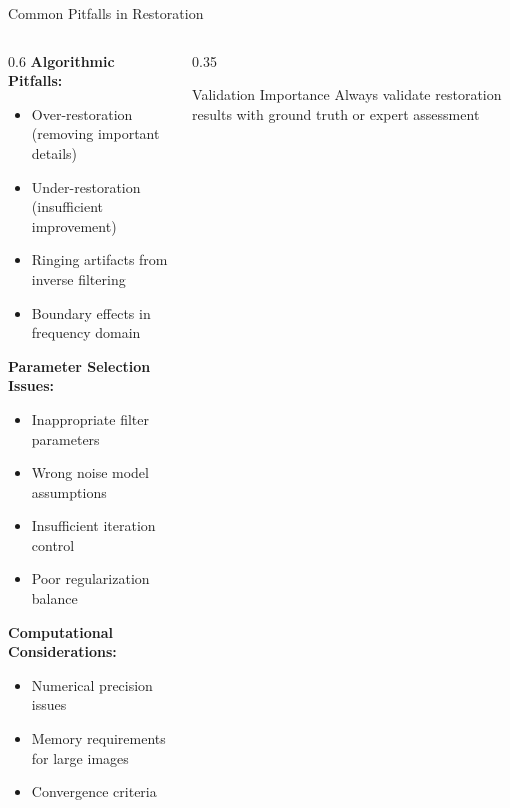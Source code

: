 \documentclass[aspectratio=169,10pt]{beamer}
\begin{document}
\begin{frame}{Common Pitfalls in Restoration}
    \begin{columns}[T]
        \begin{column}{0.6\textwidth}
            \textbf{Algorithmic Pitfalls:}
            \begin{itemize}
                \item Over-restoration (removing important details)
                \item Under-restoration (insufficient improvement)
                \item Ringing artifacts from inverse filtering
                \item Boundary effects in frequency domain
            \end{itemize}

            \textbf{Parameter Selection Issues:}
            \begin{itemize}
                \item Inappropriate filter parameters
                \item Wrong noise model assumptions
                \item Insufficient iteration control
                \item Poor regularization balance
            \end{itemize}

            \textbf{Computational Considerations:}
            \begin{itemize}
                \item Numerical precision issues
                \item Memory requirements for large images
                \item Convergence criteria
            \end{itemize}
        \end{column}
        \begin{column}{0.35\textwidth}
            \begin{keypoint}{Validation Importance}{}
                Always validate restoration results with ground truth or expert assessment
            \end{keypoint}
        \end{column}
    \end{columns}
\end{frame}
\end{document}
